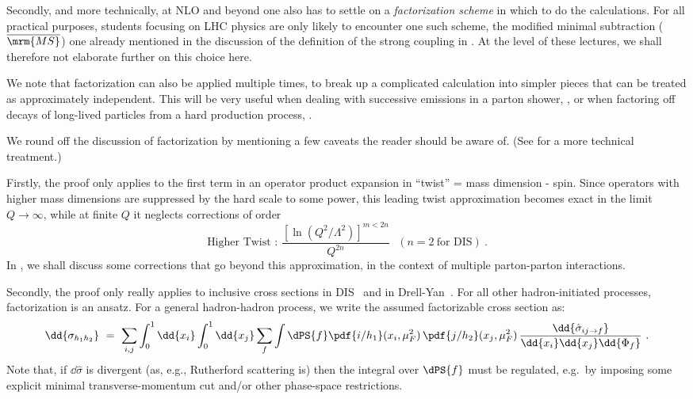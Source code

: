 %
Secondly, and more technically, at NLO and beyond one also has to settle on a
\emph{factorization scheme} in which to do the calculations. 
For all practical
purposes, students focusing on LHC physics are only likely to
encounter one such scheme, the modified minimal subtraction
($\overline{\mrm{MS}}$) one already mentioned in the discussion of the
definition of the strong coupling in . At the
level of these lectures, we shall therefore not elaborate further on this choice
here.   

We note that factorization 
can also be applied multiple times, to break up a complicated calculation
into simpler  pieces that can be treated as approximately independent.
This will be very useful when dealing with successive emissions in a
parton shower, , or
when factoring off  decays of long-lived particles from a hard
production process, . 

We round off the discussion of factorization by mentioning a few caveats
the reader should be aware of. (See \cite{Sterman:1995fz} for a more
technical treatment.)

%
%
%
Firstly, the proof only applies to the first term in an operator
product expansion in ``twist'' = mass dimension - spin. Since
operators with higher mass dimensions are suppressed by the hard scale
to some power, this leading twist approximation becomes exact in the
limit $Q \to \infty$, while at finite $Q$ it neglects corrections of
order 
\begin{equation}
\mbox{Higher Twist :
 }\frac{[\ln(Q^2/\Lambda^2)]^{m<2n}}{Q^{2n}}~~~(n=2~\mbox{for DIS})~.
\end{equation}
In , we shall discuss some corrections that go beyond
this approximation, in the context of multiple parton-parton
interactions.

Secondly, the proof only really applies to inclusive cross sections in
DIS~\cite{Collins:1981uw}  
and in Drell-Yan~\cite{Collins:1984kg}. 
For all other hadron-initiated processes, 
factorization is an ansatz. For a general hadron-hadron process, we
write the assumed factorizable cross section as: 
\begin{equation}
\dd{\sigma_{h_1h_2}} \ = \ \sum_{i,j}\int_0^1\dd{x_i}\int_0^1\dd{x_j}\sum_f\int
 \dPS{f} \pdf{i/h_1}(x_i,\mu_F^2)\,\pdf{j/h_2}(x_j,\mu_F^2)\,
 \frac{\dd{\hat{\sigma}_{ij\to f}}}{\dd{x_i}\dd{x_j}\dd{\Phi_f}}
~. \label{eq:factorization}
\end{equation}
Note that, if $\dd{\hat{\sigma}}$ is divergent (as, e.g., Rutherford
scattering is) then the integral over $\dPS{f}$ must be regulated, 
e.g.\ by imposing some explicit minimal transverse-momentum cut 
and/or other phase-space restrictions.

